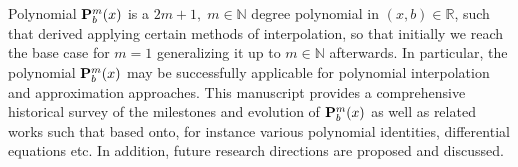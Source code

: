 Polynomial ${\mathbf{P}}\sp{m} \sb{b}(x)$ is a $2m+1, \; m\in\mathbb{N}$ degree polynomial in $(x,b) \in \mathbb{R}$,
such that derived applying certain methods of interpolation, so that initially we reach the base case for $m=1$
generalizing it up to $m\in\mathbb{N}$ afterwards.
In particular, the polynomial ${\mathbf{P}}\sp{m} \sb{b}(x)$ may be successfully applicable
for polynomial interpolation and approximation approaches.
This manuscript provides a comprehensive historical survey of the milestones and evolution of ${\mathbf{P}}\sp{m} \sb{b}(x)$
as well as related works such that based onto, for instance various polynomial identities, differential equations etc.
In addition, future research directions are proposed and discussed.
